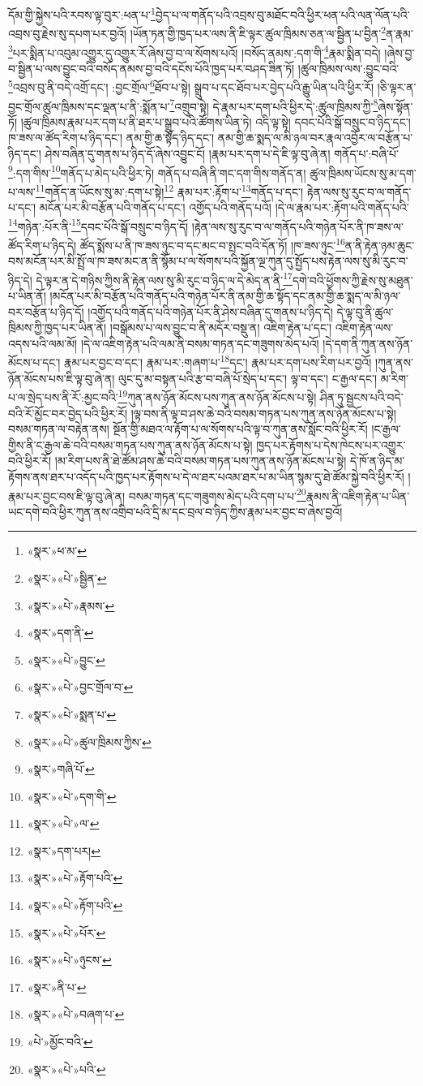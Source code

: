 དོམ་གྱི་སྐྱེས་པའི་རབས་ལྟ་བུར་:ཕན་པ་\footnote{«སྣར་»ཕ་མ་}བྱེད་པ་ལ་གནོད་པའི་འབྲས་བུ་མཐོང་བའི་ཕྱིར་ཕན་པའི་ལན་ལོན་པའི་འབྲས་བུ་རྗེས་སུ་དཔག་པར་བྱའོ། །ཡོན་ཏན་གྱི་ཁྱད་པར་ལས་ནི་ཇི་ལྟར་ཚུལ་ཁྲིམས་ཅན་ལ་སྦྱིན་པ་བྱིན་\footnote{«སྣར་»«པེ་»སྦྱིན་}ན་རྣམ་\footnote{«སྣར་»«པེ་»རྣམས་}པར་སྨིན་པ་འབུམ་འགྱུར་དུ་འགྱུར་རོ་ཞེས་བྱ་བ་ལ་སོགས་པའོ། །བསོད་ནམས་:དག་གི་\footnote{«སྣར་»དག་ནི་}རྣམ་སྨིན་བདེ། །ཞེས་བྱ་བ་སྦྱིན་པ་ལས་བྱུང་བའི་བསོད་ནམས་བྱ་བའི་དངོས་པོའི་ཁྱད་པར་བཤད་ཟིན་ཏོ། །ཚུལ་ཁྲིམས་ལས་:བྱུང་བའི་\footnote{«སྣར་»«པེ་»བྱུང་}འབྲས་བུ་ནི་བདེ་འགྲོ་དང་། :བྱང་གྲོལ་\footnote{«སྣར་»«པེ་»བྱང་གྲོལ་བ་}ཐོབ་པ་སྟེ། སྒྲུབ་པ་དང་ཐོབ་པར་བྱེད་པའི་རྒྱུ་ཡིན་པའི་ཕྱིར་རོ། །ཅི་ལྟར་ན་བྱང་གྲོལ་ཚུལ་ཁྲིམས་དང་ལྡན་པ་ནི་:སྨོན་པ་\footnote{«སྣར་»«པེ་»སྨན་པ་}འགྲུབ་སྟེ། དེ་རྣམ་པར་དག་པའི་ཕྱིར་དེ་:ཚུལ་ཁྲིམས་ཀྱི་\footnote{«སྣར་»«པེ་»ཚུལ་ཁྲིམས་ཀྱིས་}ཞེས་སྟོན་ཏོ། །ཚུལ་ཁྲིམས་རྣམ་པར་དག་པ་ནི་ཐར་པ་སྒྲུབ་པའི་ཚོགས་ཡིན་ཏེ། འདི་ལྟ་སྟེ། དབང་པོའི་སྒོ་བསྲུང་བ་ཉིད་དང་། ཁ་ཟས་ལ་ཚོད་རིག་པ་ཉིད་དང་། ནམ་གྱི་ཆ་སྟོད་ཉིད་དང་། ནམ་གྱི་ཆ་སྨད་ལ་མི་ཉལ་བར་རྣལ་འབྱོར་ལ་བརྩོན་པ་ཉིད་དང་། ཤེས་བཞིན་དུ་གནས་པ་ཉིད་དོ་ཞེས་འབྱུང་ངོ། །རྣམ་པར་དག་པ་དེ་ཇི་ལྟ་བུ་ཞེ་ན། གནོད་པ་:བཞི་པོ་\footnote{«སྣར་»གཞི་པོ་}:དག་གིས་\footnote{«སྣར་»«པེ་»དག་གི་}གནོད་པ་མེད་པའི་ཕྱིར་ཏེ། གནོད་པ་བཞི་ནི་གང་དག་གིས་གནོད་ན། ཚུལ་ཁྲིམས་ཡོངས་སུ་མ་དག་པ་ལས་\footnote{«སྣར་»«པེ་»ལ་}གནོད་ན་ཡོངས་སུ་མ་:དག་པ་སྟེ།\footnote{«སྣར་»དག་པར།} རྣམ་པར་:རྟོག་པ་\footnote{«སྣར་»«པེ་»རྟོག་པའི་}གནོད་པ་དང་། རྟེན་ལས་སུ་རུང་བ་ལ་གནོད་པ་དང་། མངོན་པར་མི་བརྩོན་པའི་གནོད་པ་དང་། འགྱོད་པའི་གནོད་པའོ། །དེ་ལ་རྣམ་པར་:རྟོག་པའི་གནོད་པའི་\footnote{«སྣར་»«པེ་»རྟོག་པའི་}གཉེན་:པོར་ནི་\footnote{«སྣར་»«པེ་»པོར་}དབང་པོའི་སྒོ་བསྲུང་བ་ཉིད་དོ། །རྟེན་ལས་སུ་རུང་བ་ལ་གནོད་པའི་གཉེན་པོར་ནི་ཁ་ཟས་ལ་ཚོད་རིག་པ་ཉིད་དེ། ཚོད་སྨོས་པ་ནི་ཁ་ཟས་ཉུང་བ་དང་མང་བ་སྤང་བའི་དོན་ཏོ། །ཁ་ཟས་ཉུང་\footnote{«སྣར་»«པེ་»ཉུངས་}ན་ནི་རྟེན་ཉམ་ཆུང་བས་མངོན་པར་མི་སྤྲོ་ལ་ཁ་ཟས་མང་ན་ནི་སྙོམ་པ་ལ་སོགས་པའི་སྐྱོན་ལྔ་ཀུན་དུ་སྤྱོད་པས་རྟེན་ལས་སུ་མི་རུང་བ་ཉིད་དེ། དེ་ལྟར་ན་དེ་གཉིས་ཀྱིས་ནི་རྟེན་ལས་སུ་མི་རུང་བ་ཉིད་ལ་དེ་མེད་ན་ནི་\footnote{«སྣར་»ནི་པ་}དགེ་བའི་ཕྱོགས་ཀྱི་རྗེས་སུ་མཐུན་པ་ཡིན་ནོ། །མངོན་པར་མི་བརྩོན་པའི་གནོད་པའི་གཉེན་པོར་ནི་ནམ་གྱི་ཆ་སྟོད་དང་ནམ་གྱི་ཆ་སྨད་ལ་མི་ཉལ་བར་བརྩོན་པ་ཉིད་དོ། །འགྱོད་པའི་གནོད་པའི་གཉེན་པོར་ནི་ཤེས་བཞིན་དུ་གནས་པ་ཉིད་དེ། དེ་ལྟ་བུ་ནི་ཚུལ་ཁྲིམས་ཀྱི་ཁྱད་པར་ཡིན་ནོ། །བསྒོམས་པ་ལས་བྱུང་བ་ནི་མདོར་བསྡུ་ན། འཇིག་རྟེན་པ་དང་། འཇིག་རྟེན་ལས་འདས་པའི་ལམ་མོ། །དེ་ལ་འཇིག་རྟེན་པའི་ལམ་ནི་བསམ་གཏན་དང་གཟུགས་མེད་པའོ། །དེ་དག་ནི་ཀུན་ནས་ཉོན་མོངས་པ་དང་། རྣམ་པར་བྱང་བ་དང་། རྣམ་པར་:གཞག་པ་\footnote{«སྣར་»«པེ་»བཞག་པ་}དང་། རྣམ་པར་དག་པས་རིག་པར་བྱའོ། །ཀུན་ནས་ཉོན་མོངས་པས་ཇི་ལྟ་བུ་ཞེ་ན། ལུང་དུ་མ་བསྟན་པའི་རྩ་བ་བཞི་པོ་སྲེད་པ་དང་། ལྟ་བ་དང་། ང་རྒྱལ་དང་། མ་རིག་པ་ལ་སྲེད་པས་ནི་རོ་:མྱང་བའི་\footnote{«པེ་»མྱོང་བའི་}ཀུན་ནས་ཉོན་མོངས་པས་ཀུན་ནས་ཉོན་མོངས་པ་སྟེ། ཤིན་ཏུ་སྦྱངས་པའི་བདེ་བའི་རོ་མྱོང་བར་བྱེད་པའི་ཕྱིར་རོ། །ལྟ་བས་ནི་ལྟ་བ་ཤས་ཆེ་བའི་བསམ་གཏན་པས་ཀུན་ནས་ཉོན་མོངས་པ་སྟེ། བསམ་གཏན་ལ་བརྟེན་ནས། སྔོན་གྱི་མཐའ་ལ་རྟོག་པ་ལ་སོགས་པའི་ལྟ་བ་ཀུན་ནས་སློང་བའི་ཕྱིར་རོ། །ང་རྒྱལ་གྱིས་ནི་ང་རྒྱལ་ཆེ་བའི་བསམ་གཏན་པས་ཀུན་ནས་ཉོན་མོངས་པ་སྟེ། ཁྱད་པར་རྟོགས་པ་དེས་ཁེངས་པར་འགྱུར་བའི་ཕྱིར་རོ། །མ་རིག་པས་ནི་ཐེ་ཚོམ་ཤས་ཆེ་བའི་བསམ་གཏན་པས་ཀུན་ནས་ཉོན་མོངས་པ་སྟེ། དེ་ཁོ་ན་ཉིད་མ་རྟོགས་ནས་ཐར་པ་འདོད་པའི་ཁྱད་པར་རྟོགས་པ་དེ་ལ་ཐར་པའམ་ཐར་པ་མ་ཡིན་སྙམ་དུ་ཐེ་ཚོམ་སྐྱེ་བའི་ཕྱིར་རོ། །རྣམ་པར་བྱང་བས་ཇི་ལྟ་བུ་ཞེ་ན། བསམ་གཏན་དང་གཟུགས་མེད་པའི་དག་པ་པ་\footnote{«སྣར་»«པེ་»པའི་}རྣམས་ནི་འཇིག་རྟེན་པ་ཡིན་ཡང་དགེ་བའི་ཕྱིར་ཀུན་ནས་འགྲིབ་པའི་དྲི་མ་དང་བྲལ་བ་ཉིད་ཀྱིས་རྣམ་པར་བྱང་བ་ཞེས་བྱའོ། 